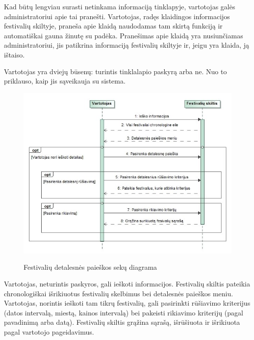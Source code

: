 \documentclass{VUMIFPSkursinis}
\begin{document}
Kad būtų lengviau surasti netinkama informaciją tinklapyje, vartotojas galės administratoriui apie tai pranešti. Vartotojas, radęs klaidingos informacijos festivalių skiltyje, praneša apie klaidą naudodamas tam skirtą funkciją ir automatiškai gauna žinutę su padėka. Pranešimas apie klaidą yra nusiunčiamas administratoriui, jis patikrina informaciją festivalių skiltyje ir, jeigu yra klaida, ją ištaiso.

Vartotojas yra dviejų būsenų: turintis tinklalapio paskyrą arba ne. Nuo to priklauso, kaip jis sąveikauja su sistema. 

\begin{figure}[H]
    \centering
    \includegraphics[scale=0.7]{img/geri/KlientPaieska}
    \label{img:uml23}
	\caption{Festivalių detalesnės paieškos sekų diagrama}
\end{figure}

Vartotojas, neturintis paskyros, gali ieškoti informacijos. Festivalių skiltis pateikia chronologiškai išrikiuotus festivalių skelbimus bei detalesnės paieškos meniu. Vartotojas, norintis ieškoti tam tikrų festivalių, gali pasirinkti rūšiavimo kriterijus (datos intervalą, miestą, kainos intervalą) bei pakeisti rikiavimo kriterijų (pagal pavadinimą arba datą). Festivalių skiltis grąžina sąrašą, išrūšiuota ir išrikiuota pagal vartotojo pageidavimus.
\end{document}
